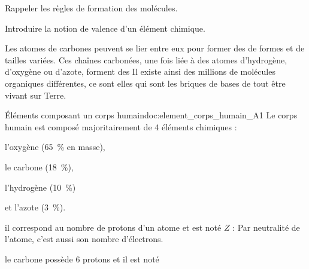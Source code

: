 \tetePremStssOrga
\vspace*{-30pt}


\begin{objectifs}
  \item Rappeler les règles de formation des molécules.
  \item Introduire la notion de valence d'un élément chimique.
\end{objectifs}

\begin{contexte}
  Les atomes de carbones peuvent se lier entre eux pour former des  de formes et de tailles variées.
  Ces chaînes carbonées, une fois liée à des atomes d'hydrogène, d'oxygène ou d'azote, forment des 
  Il existe ainsi des millions de molécules organiques différentes, ce sont elles qui sont les briques de bases de tout être vivant sur Terre.

\end{contexte}


\begin{doc}{Éléments composant un corps humain}{doc:element_corps_humain_A1}
  Le corps humain est composé majoritairement de 4 éléments chimiques :
  \vspace*{-4pt}
  \begin{listePoints}[2]
    \item l'oxygène    (\qty{65}{\percent} en masse),
    \item le carbone   (\qty{18}{\percent}),
    \item l'hydrogène  (\qty{10}{\percent})
    \item et l'azote   (\qty{3}{\percent}).
  \end{listePoints}
  
  \begin{importants}
     il correspond au nombre de protons d'un atome et est noté $Z$ : 
    Par neutralité de l'atome, c'est aussi son nombre d'électrons.
  \end{importants}
   \exemple le carbone possède 6 protons et il est noté 
\end{doc}


